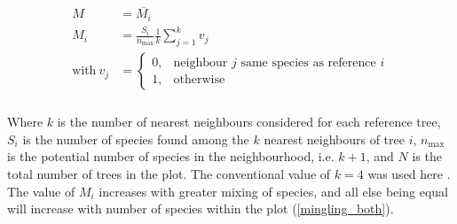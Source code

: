 \documentclass[11pt,a4paper]{article}
\begin{document}
\begin{align}
\begin{split}
	M &= \overline{M_{i}} \\
	M_{i} &= \frac{S_{i}}{n_{\text{max}}} \frac{1}{k} \sum_{j=1}^{k} v_{j} \\
	\text{with}\ v_{j} &= \begin{cases}
		0,& \text{neighbour $j$ same species as reference $i$} \\
		1,& \text{otherwise}
	\end{cases} \\
\end{split}
\end{align}

Where $k$ is the number of nearest neighbours considered for each reference tree, $S_{i}$ is the number of species found among the $k$ nearest neighbours of tree $i$, $n_{\text{max}}$ is the potential number of species in the neighbourhood, i.e. $k + 1$, and $N$ is the total number of trees in the plot. The conventional value of $k = 4$ was used here \citep{Gadow2002, Hui2004, Hui2007}. The value of $M_{i}$ increases with greater mixing of species, and all else being equal will increase with number of species within the plot (\autoref{mingling_both}).
\end{document}
